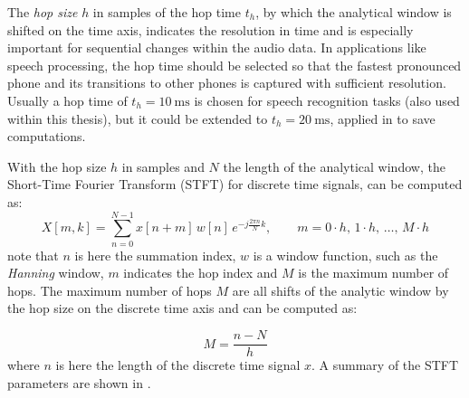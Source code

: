 The \emph{hop size} $h$ in samples of the hop time $t_h$, by which the analytical window is shifted on the time axis, indicates the resolution in time and is especially important for sequential changes within the audio data.
In applications like speech processing, the hop time should be selected so that the fastest pronounced phone and its transitions to other phones is captured with sufficient resolution.
Usually a hop time of $t_{h}=\SI{10}{\milli\second}$ is chosen for speech recognition tasks (also used within this thesis), but it could be extended to $t_{h}=\SI{20}{\milli\second}$, applied in \cite{Peter2020} to save computations.

With the hop size $h$ in samples and $N$ the length of the analytical window, the Short-Time Fourier Transform (STFT) for discrete time signals, can be computed as:
\begin{equation}\label{eq:signal_spec_stft}
    X[m, k] = \sum_{n=0}^{N-1} x[n + m] \, w[n] \, e^{-j\frac{2 \pi n}{N}k}, \qquad m = 0 \cdot h, \, 1 \cdot h, \, \dots, \, M \cdot h 
\end{equation}
note that $n$ is here the summation index, $w$ is a window function, such as the \emph{Hanning} window, $m$ indicates the hop index and $M$ is the maximum number of hops.
The maximum number of hops $M$ are all shifts of the analytic window by the hop size on the discrete time axis and can be computed as:

\begin{equation}\label{eq:signal_spec_hop}
  M = \frac{n-N}{h}
\end{equation}
where $n$ is here the length of the discrete time signal $x$.
A summary of the STFT parameters are shown in .

